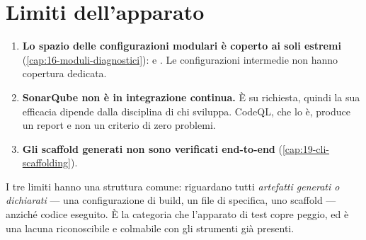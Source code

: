 \section{Limiti dell'apparato}

\begin{enumerate}[leftmargin=*]
  \item \textbf{Lo spazio delle configurazioni modulari \`e coperto ai soli
  estremi} (\cref{cap:16-moduli-diagnostici}):  e . Le
  configurazioni intermedie non hanno copertura dedicata.

  \item \textbf{SonarQube non \`e in integrazione continua.} \`E su
  richiesta, quindi la sua efficacia dipende dalla disciplina di chi sviluppa.
  CodeQL, che lo \`e, produce un report e non un criterio di zero problemi.

  \item \textbf{Gli scaffold generati non sono verificati end-to-end}
  (\cref{cap:19-cli-scaffolding}).
\end{enumerate}

I tre limiti hanno una struttura comune: riguardano tutti \emph{artefatti
generati o dichiarati} --- una configurazione di build, un file di
specifica, uno scaffold --- anzich\'e codice eseguito. \`E la categoria che
l'apparato di test copre peggio, ed \`e una lacuna riconoscibile e colmabile con
gli strumenti gi\`a presenti.
